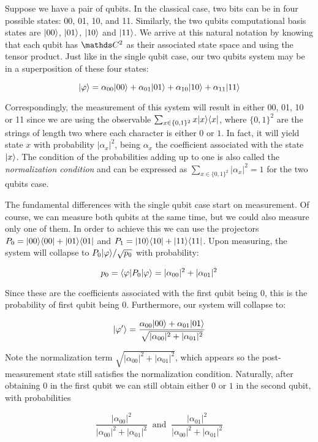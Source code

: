 Suppose we have a pair of qubits. In the classical case, two bits can be in four possible states: 00, 01, 10, and 11. Similarly, the two qubits computational basis states are $|00\rangle$, $|01\rangle$, $|10\rangle$ and $|11\rangle$. We arrive at this natural notation by knowing that each qubit has $\C^2$ as their associated state space and using the tensor product. Just like in the single qubit case, our two qubits system may be in a superposition of these four states:

$$ |\varphi\rangle = \alpha_{00} |00\rangle + \alpha_{01} |01\rangle + \alpha_{10} |10\rangle + \alpha_{11} |11\rangle $$

Correspondingly, the measurement of this system will result in either 00, 01, 10 or 11 since we are using the observable $\sum_{x \in \{0,1\}^2} x |x\rangle\langle x|$, where $\{0,1\}^2$ are the strings of length two where each character is either $0$ or $1$. In fact, it will yield state $x$ with probability $|\alpha_x|^2$, being $\alpha_x$ the coefficient associated with the state $|x\rangle$. The condition of the probabilities adding up to one is also called the \emph{normalization condition} and can be expressed as $\sum_{x \in \{0,1\}^2} |\alpha_x|^2 = 1$ for the two qubits case.

The fundamental differences with the single qubit case start on measurement. Of course, we can measure both qubits at the same time, but we could also measure only one of them. In order to achieve this we can use the projectors $P_0 = |00\rangle\langle00| + |01\rangle\langle01|$ and $P_1 = |10\rangle\langle10| + |11\rangle\langle11|$. Upon measuring, the system will collapse to $P_0|\varphi\rangle / \sqrt{p_0}$ with probability:

$$ p_0 = \langle\varphi|P_0|\varphi\rangle = |\alpha_{00}|^2 + |\alpha_{01}|^2 $$

Since these are the coefficients associated with the first qubit being $0$, this is the probability of first qubit being 0. Furthermore, our system will collapse to:

$$ |\varphi'\rangle = \frac{ \alpha_{00} |00\rangle + \alpha_{01} |01\rangle }{ \sqrt{|\alpha_{00}|^2 + |\alpha_{01}|^2} } $$

Note the normalization term $\sqrt{|\alpha_{00}|^2 + |\alpha_{01}|^2}$, which appears so the post-measurement state still satisfies the normalization condition. Naturally, after obtaining $0$ in the first qubit we can still obtain either $0$ or $1$ in the second qubit, with probabilities 

$$ \frac{ |\alpha_{00}|^2 }{ |\alpha_{00}|^2 + |\alpha_{01}|^2 }  \ \text{ and } \ 
\frac{ |\alpha_{01}|^2 }{ |\alpha_{00}|^2 + |\alpha_{01}|^2 } $$

